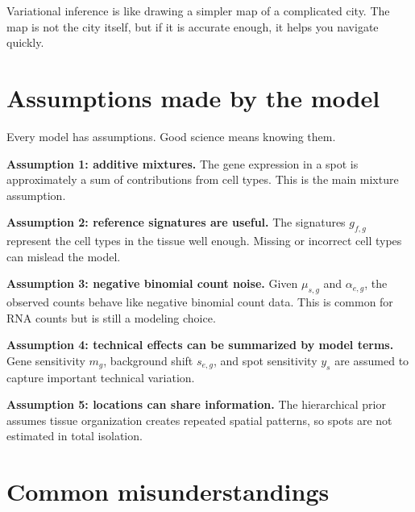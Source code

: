 \documentclass[11pt]{article}
\newcommand{\term}[1]{\textbf{#1}}
\begin{document}
\begin{bigidea}
Variational inference is like drawing a simpler map of a complicated city. The map is not the city itself, but if it is accurate enough, it helps you navigate quickly.
\end{bigidea}

\section{Assumptions made by the model}

Every model has assumptions. Good science means knowing them.

\begin{assumptionbox}
\term{Assumption 1: additive mixtures.} The gene expression in a spot is approximately a sum of contributions from cell types. This is the main mixture assumption.
\end{assumptionbox}

\begin{assumptionbox}
\term{Assumption 2: reference signatures are useful.} The signatures $g_{f,g}$ represent the cell types in the tissue well enough. Missing or incorrect cell types can mislead the model.
\end{assumptionbox}

\begin{assumptionbox}
\term{Assumption 3: negative binomial count noise.} Given $\mu_{s,g}$ and $\alpha_{e,g}$, the observed counts behave like negative binomial count data. This is common for RNA counts but is still a modeling choice.
\end{assumptionbox}

\begin{assumptionbox}
\term{Assumption 4: technical effects can be summarized by model terms.} Gene sensitivity $m_g$, background shift $s_{e,g}$, and spot sensitivity $y_s$ are assumed to capture important technical variation.
\end{assumptionbox}

\begin{assumptionbox}
\term{Assumption 5: locations can share information.} The hierarchical prior assumes tissue organization creates repeated spatial patterns, so spots are not estimated in total isolation.
\end{assumptionbox}

\section{Common misunderstandings}
\end{document}
